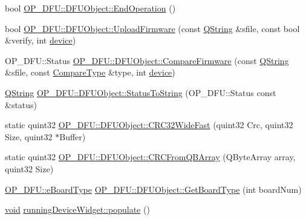 \begin{DoxyCompactItemize}
\item 
bool \hyperlink{group___uploader_ga16f60a8d921f01aca803178398ccdf45}{\-O\-P\-\_\-\-D\-F\-U\-::\-D\-F\-U\-Object\-::\-End\-Operation} ()
\item 
bool \hyperlink{group___uploader_gacccdb64a8aa1c8ff0f90296fcb935fef}{\-O\-P\-\_\-\-D\-F\-U\-::\-D\-F\-U\-Object\-::\-Upload\-Firmware} (const \hyperlink{group___u_a_v_objects_plugin_gab9d252f49c333c94a72f97ce3105a32d}{\-Q\-String} \&sfile, const bool \&verify, int \hyperlink{struct_o_p___d_f_u_1_1device}{device})
\item 
\-O\-P\-\_\-\-D\-F\-U\-::\-Status \hyperlink{group___uploader_ga3c9852f8106d7177b5e27087f6e28764}{\-O\-P\-\_\-\-D\-F\-U\-::\-D\-F\-U\-Object\-::\-Compare\-Firmware} (const \hyperlink{group___u_a_v_objects_plugin_gab9d252f49c333c94a72f97ce3105a32d}{\-Q\-String} \&sfile, const \hyperlink{namespace_o_p___d_f_u_a687d96e45447775c09aced0f06db435b}{\-Compare\-Type} \&type, int \hyperlink{struct_o_p___d_f_u_1_1device}{device})
\item 
\hyperlink{group___u_a_v_objects_plugin_gab9d252f49c333c94a72f97ce3105a32d}{\-Q\-String} \hyperlink{group___uploader_gae048f84f5abd2be97bbe40fcf6e193c4}{\-O\-P\-\_\-\-D\-F\-U\-::\-D\-F\-U\-Object\-::\-Status\-To\-String} (\-O\-P\-\_\-\-D\-F\-U\-::\-Status const \&status)
\item 
static quint32 \hyperlink{group___uploader_gae755106568ea0611498e45e43bfa9e4d}{\-O\-P\-\_\-\-D\-F\-U\-::\-D\-F\-U\-Object\-::\-C\-R\-C32\-Wide\-Fast} (quint32 \-Crc, quint32 \-Size, quint32 $\ast$\-Buffer)
\item 
static quint32 \hyperlink{group___uploader_ga8b3213586813e0e852bd8e8460f02fc0}{\-O\-P\-\_\-\-D\-F\-U\-::\-D\-F\-U\-Object\-::\-C\-R\-C\-From\-Q\-B\-Array} (\-Q\-Byte\-Array array, quint32 \-Size)
\item 
\hyperlink{namespace_o_p___d_f_u_a7226d41298447c34a2c489cb47c470bd}{\-O\-P\-\_\-\-D\-F\-U\-::e\-Board\-Type} \hyperlink{group___uploader_ga9376138780f2860b37c7b9ae8af3f799}{\-O\-P\-\_\-\-D\-F\-U\-::\-D\-F\-U\-Object\-::\-Get\-Board\-Type} (int board\-Num)
\item 
\hyperlink{group___u_a_v_objects_plugin_ga444cf2ff3f0ecbe028adce838d373f5c}{void} \hyperlink{group___uploader_ga361969437ae7c23ebaa3d646e742dbc5}{running\-Device\-Widget\-::populate} ()
\end{DoxyCompactItemize}
